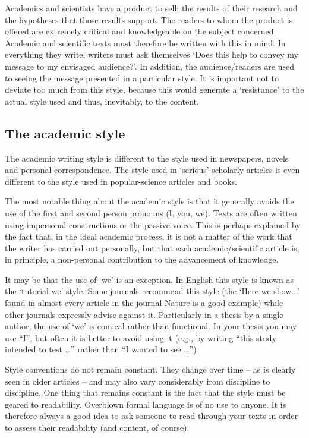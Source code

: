 Academics and scientists have a product to sell: the results of their research and the hypotheses that those results support. The readers to whom the product is offered are extremely critical and knowledgeable on the subject concerned. Academic and scientific texts must therefore be written with this in mind. In everything they write, writers must ask themselves `Does this help to convey my message to my envisaged audience?'. In addition, the audience/readers are used to seeing the message presented in a particular style. It is important not to deviate too much from this style, because this would generate a `resistance' to the actual style used and thus, inevitably, to the content.

\subsection{The academic style}\label{sec:_academic_style}
The academic writing style is different to the style used in newspapers, novels and personal correspondence. The style used in `serious' scholarly articles is even different to the style used in popular-science articles and books.

The most notable thing about the academic style is that it generally avoids the use of the first and second person pronouns (I, you, we). Texts are often written using impersonal constructions or the passive voice. This is perhaps explained by the fact that, in the ideal academic process, it is not a matter of the work that the writer has carried out personally, but that each academic/scientific article is, in principle, a non-personal contribution to the advancement of knowledge.

It may be that the use of `we' is an exception. In English this style is known as the `tutorial we' style. Some journals recommend this style (the `Here we show...' found in almost every article in the journal Nature is a good example) while other journals expressly advise against it. Particularly in a thesis by a single author, the use of `we' is comical rather than functional. In your thesis you may use ``I'', but often it is better to avoid using it (e.g., by writing ``this study intended to test …'' rather than ``I wanted to see …'')

Style conventions do not remain constant. They change over time – as is clearly seen in older articles – and may also vary considerably from discipline to discipline. One thing that remains constant is the fact that the style must be geared to readability. Overblown formal language is of no use to anyone. It is therefore always a good idea to ask someone to read through your texts in order to assess their readability (and content, of course).

